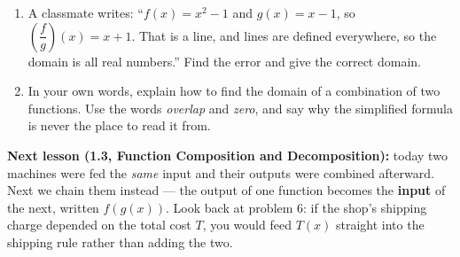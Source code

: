 \documentclass[10pt]{article}
\begin{document}
\begin{enumerate}[leftmargin=1.9em, itemsep=8pt, start=8]

\item A classmate writes: ``$f(x) = x^2 - 1$ and $g(x) = x - 1$, so
      $\left(\dfrac{f}{g}\right)(x) = x + 1$. That is a line, and lines are defined everywhere,
      so the domain is all real numbers.'' Find the error and give the correct domain.

\item In your own words, explain how to find the domain of a combination of two functions. Use
      the words \emph{overlap} and \emph{zero}, and say why the simplified formula is never the
      place to read it from.

\end{enumerate}

\vspace{0.08in}

\boxguard[8]
\begin{spiralbox}
\small
\textbf{Next lesson (1.3, Function Composition and Decomposition):} today two machines were fed
the \emph{same} input and their outputs were combined afterward. Next we chain them instead ---
the output of one function becomes the \textbf{input} of the next, written $f(g(x))$. Look back
at problem 6: if the shop's shipping charge depended on the total cost $T$, you would feed
$T(x)$ straight into the shipping rule rather than adding the two.
\end{spiralbox}
\end{document}
